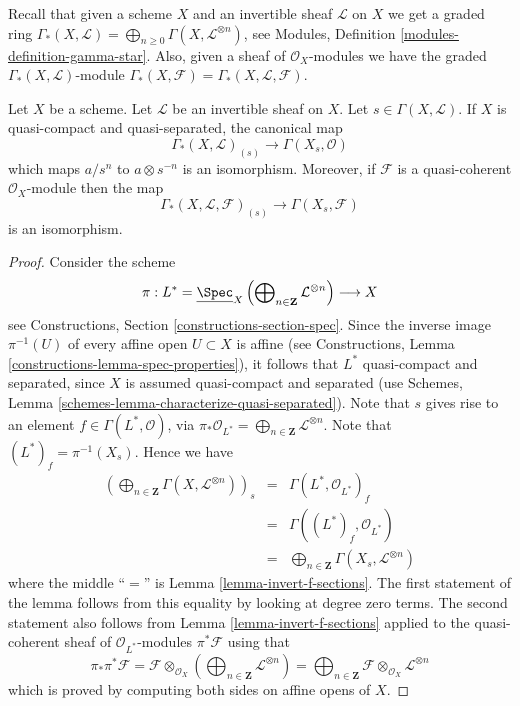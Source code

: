 \noindent
Recall that given a scheme $X$ and an invertible sheaf $\mathcal{L}$
on $X$ we get a graded ring
$\Gamma_*(X, \mathcal{L}) =
\bigoplus_{n \geq 0} \Gamma(X, \mathcal{L}^{\otimes n})$,
see Modules, Definition \ref{modules-definition-gamma-star}.
Also, given a sheaf of $\mathcal{O}_X$-modules we have the
graded $\Gamma_*(X, \mathcal{L})$-module
$\Gamma_*(X, \mathcal{F}) = \Gamma_*(X, \mathcal{L}, \mathcal{F})$.

\begin{lemma}
\label{lemma-invert-s-sections}
Let $X$ be a scheme. Let $\mathcal{L}$ be an invertible sheaf on $X$.
Let $s \in \Gamma(X, \mathcal{L})$.
If $X$ is quasi-compact and quasi-separated, the canonical map
$$
\Gamma_*(X, \mathcal{L})_{(s)}
\longrightarrow
\Gamma(X_s, \mathcal{O})
$$
which maps $a/s^n$ to $a \otimes s^{-n}$ is an isomorphism.
Moreover, if $\mathcal{F}$ is a quasi-coherent $\mathcal{O}_X$-module
then the map
$$
\Gamma_*(X, \mathcal{L}, \mathcal{F})_{(s)}
\longrightarrow
\Gamma(X_s, \mathcal{F})
$$
is an isomorphism.
\end{lemma}

\begin{proof}
Consider the scheme
$$
\pi :
L^* = \underline{\Spec}_X\left(
\bigoplus\nolimits_{n \in \mathbf{Z}} \mathcal{L}^{\otimes n}
\right)
\longrightarrow
X
$$
see Constructions, Section \ref{constructions-section-spec}.
Since the inverse image $\pi^{-1}(U)$ of every affine open
$U \subset X$ is affine (see
Constructions, Lemma \ref{constructions-lemma-spec-properties}),
it follows that $L^*$ quasi-compact and separated,
since $X$ is assumed quasi-compact and separated (use
Schemes, Lemma \ref{schemes-lemma-characterize-quasi-separated}).
Note that $s$ gives rise to an element $f \in \Gamma(L^*, \mathcal{O})$, via
$\pi_*\mathcal{O}_{L^*} =
\bigoplus_{n \in \mathbf{Z}} \mathcal{L}^{\otimes n}$.
Note that $(L^*)_f = \pi^{-1}(X_s)$. Hence we have
\begin{eqnarray*}
\left(
\bigoplus\nolimits_{n \in \mathbf{Z}} \Gamma(X, \mathcal{L}^{\otimes n})
\right)_s
& = &
\Gamma(L^*, \mathcal{O}_{L^*})_f \\
& = &
\Gamma((L^*)_f, \mathcal{O}_{L^*}) \\
& = &
\bigoplus\nolimits_{n \in \mathbf{Z}} \Gamma(X_s, \mathcal{L}^{\otimes n})
\end{eqnarray*}
where the middle ``$ = $'' is Lemma \ref{lemma-invert-f-sections}.
The first statement of the lemma follows from this equality by looking at
degree zero terms. The second statement also follows
from Lemma \ref{lemma-invert-f-sections} applied to the quasi-coherent sheaf
of $\mathcal{O}_{L^*}$-modules $\pi^*\mathcal{F}$ using that
$$
\pi_*\pi^*\mathcal{F} =
\mathcal{F} \otimes_{\mathcal{O}_X}
\left(\bigoplus\nolimits_{n \in \mathbf{Z}} \mathcal{L}^{\otimes n}\right) =
\bigoplus\nolimits_{n \in \mathbf{Z}}
\mathcal{F} \otimes_{\mathcal{O}_X} \mathcal{L}^{\otimes n}
$$
which is proved by computing both sides on affine opens of $X$.
\end{proof}

